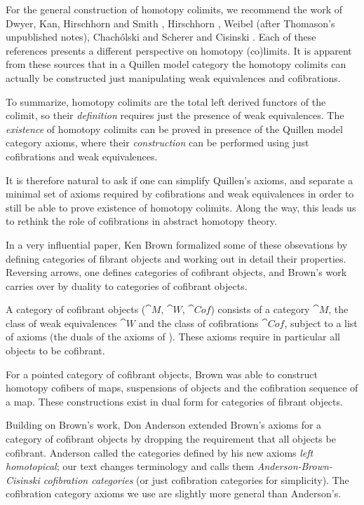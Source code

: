 For the general construction of homotopy colimits, we recommend the work of Dwyer, Kan, Hirschhorn and Smith \cite{Dwyer-Kan-Hirschhorn-Smith}, Hirschhorn \cite{Hirschhorn}, Weibel \cite{Weibel} (after Thomason's unpublished notes), Chach\'{o}lski and Scherer \cite{ChacScherer} and Cisinski \cite{Cisinski4}. Each of these references presents a different perspective on homotopy (co)limits. It is apparent from these sources that in a Quillen model category the homotopy colimits can actually be constructed just manipulating weak equivalences and cofibrations. 

\bigskip

To summarize, homotopy colimits are the total left derived functors of the colimit, so their {\it definition} requires just the presence of weak equivalences. The {\it existence} of homotopy colimits can be proved in presence of the Quillen model category axioms, where their {\it construction} can be performed using just cofibrations and weak equivalences.

It is therefore natural to ask if one can simplify Quillen's axioms, and separate a minimal set of axioms required by cofibrations and weak equivalences in order to still be able to prove existence of homotopy colimits. Along the way, this leads us to rethink the role of cofibrations in abstract homotopy theory.

\bigskip

In a very influential paper, Ken Brown \cite{Brown} formalized some of these obsevations by defining categories of fibrant objects and working out in detail their properties. Reversing arrows, one defines categories of cofibrant objects, and Brown's work carries over by duality to categories of cofibrant objects. 

A category of cofibrant objects (${\cat M}$, ${\cat W}$, ${\cat Cof}$) consists of a category ${\cat M}$, the class of weak equivalences ${\cat W}$ and the class of cofibrations ${\cat Cof}$, subject to a list of axioms (the duals of the axioms of \cite{Brown}). These axioms require in particular all objects to be cofibrant.

For a pointed category of cofibrant objects, Brown was able to construct homotopy cofibers of maps, suspensions of objects and the cofibration sequence of a map. These constructions exist in dual form for categories of fibrant objects.

\bigskip

Building on Brown's work, Don Anderson \cite{Anderson1} extended Brown's axioms for a category of cofibrant objects by dropping the requirement that all objects be cofibrant. Anderson called the categories defined by his new axioms {\it left homotopical}; our text changes terminology and calls them {\it Anderson-Brown-Cisinski cofibration categories} (or just cofibration categories for simplicity). The cofibration category axioms we use are slightly more general than Anderson's.

